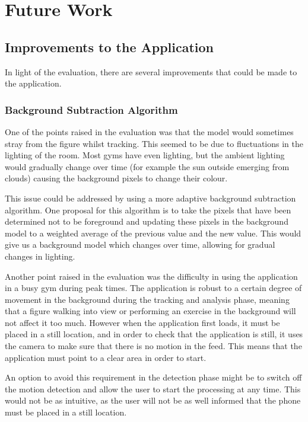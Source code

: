 \section{Future Work}
\label{sec:future}

\subsection{Improvements to the Application}
\label{sec:improvements}

In light of the evaluation, there are several improvements that could be made to the application.

\subsubsection{Background Subtraction Algorithm}

One of the points raised in the evaluation was that the model would sometimes stray from the figure whilst tracking. This seemed to be due to fluctuations in the lighting of the room. Most gyms have even lighting, but the ambient lighting would gradually change over time (for example the sun outside emerging from clouds) causing the background pixels to change their colour.

This issue could be addressed by using a more adaptive background subtraction algorithm. One proposal for this algorithm is to take the pixels that have been determined not to be foreground and updating these pixels in the background model to a weighted average of the previous value and the new value. This would give us a background model which changes over time, allowing for gradual changes in lighting.

Another point raised in the evaluation was the difficulty in using the application in a busy gym during peak times. The application is robust to a certain degree of movement in the background during the tracking and analysis phase, meaning that a figure walking into view or performing an exercise in the background will not affect it too much. However when the application first loads, it must be placed in a still location, and in order to check that the application is still, it uses the camera to make sure that there is no motion in the feed. This means that the application must point to a clear area in order to start.

An option to avoid this requirement in the detection phase might be to switch off the motion detection and allow the user to start the processing at any time. This would not be as intuitive, as the user will not be as well informed that the phone must be placed in a still location.

